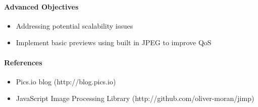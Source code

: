 \documentclass{article}
\begin{document}
    \paragraph{Advanced Objectives}
        \begin{itemize}
          \item Addressing potential scalability issues
          \item Implement basic previews using built in JPEG to improve QoS
        \end{itemize}
    \paragraph{References}
        \begin{itemize}
          \item Pics.io blog (http://blog.pics.io)
          \item JavaScript Image Processing Library (http://github.com/oliver-moran/jimp)
        \end{itemize}
\end{document}
